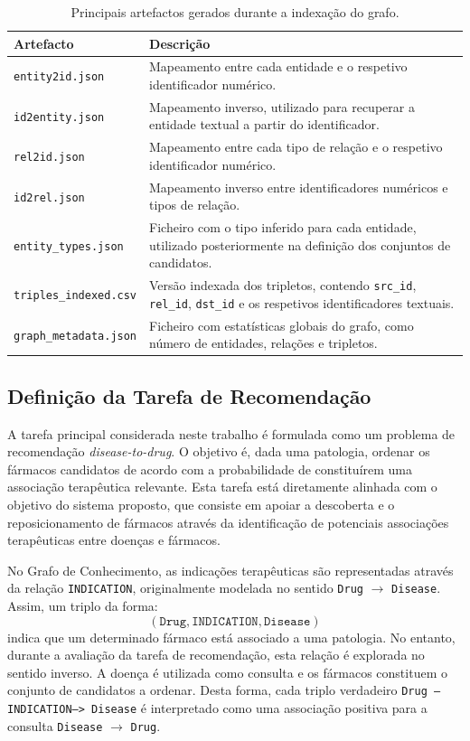 \begin{table}[H]
\centering
\caption{Principais artefactos gerados durante a indexação do grafo.}
\label{tab:artefactos_indexacao}
\begin{tabular}{|l|p{9cm}|}
\hline
\rowcolor[HTML]{EFEFEF}
\textbf{Artefacto} & \textbf{Descrição} \\ \hline
\texttt{entity2id.json} & Mapeamento entre cada entidade e o respetivo identificador numérico. \\ \hline
\texttt{id2entity.json} & Mapeamento inverso, utilizado para recuperar a entidade textual a partir do identificador. \\ \hline
\texttt{rel2id.json} & Mapeamento entre cada tipo de relação e o respetivo identificador numérico. \\ \hline
\texttt{id2rel.json} & Mapeamento inverso entre identificadores numéricos e tipos de relação. \\ \hline
\texttt{entity\_types.json} & Ficheiro com o tipo inferido para cada entidade, utilizado posteriormente na definição dos conjuntos de candidatos. \\ \hline
\texttt{triples\_indexed.csv} & Versão indexada dos tripletos, contendo \texttt{src\_id}, \texttt{rel\_id}, \texttt{dst\_id} e os respetivos identificadores textuais. \\ \hline
\texttt{graph\_metadata.json} & Ficheiro com estatísticas globais do grafo, como número de entidades, relações e tripletos. \\ \hline
\end{tabular}
\end{table}


\subsection{Definição da Tarefa de Recomendação}
\label{subsec:definicao-tarefa}
A tarefa principal considerada neste trabalho é formulada como um problema de recomendação \emph{disease-to-drug}. O objetivo é, dada uma patologia, ordenar os fármacos candidatos de acordo com a probabilidade de constituírem uma associação terapêutica relevante. Esta tarefa está diretamente alinhada com o objetivo do sistema proposto, que consiste em apoiar a descoberta e o reposicionamento de fármacos através da identificação de potenciais associações terapêuticas entre doenças e fármacos.

No Grafo de Conhecimento, as indicações terapêuticas são representadas através da relação \texttt{INDICATION}, originalmente modelada no sentido \texttt{Drug} $\rightarrow$ \texttt{Disease}. Assim, um triplo da forma:
\[(\texttt{Drug}, \texttt{INDICATION}, \texttt{Disease})\]
indica que um determinado fármaco está associado a uma patologia. No entanto, durante a avaliação da tarefa de recomendação, esta relação é explorada no sentido inverso. A doença é utilizada como consulta e os fármacos constituem o conjunto de candidatos a ordenar. Desta forma, cada triplo verdadeiro \texttt{Drug --INDICATION--> Disease} é interpretado como uma associação positiva para a consulta \texttt{Disease} $\rightarrow$ \texttt{Drug}.

